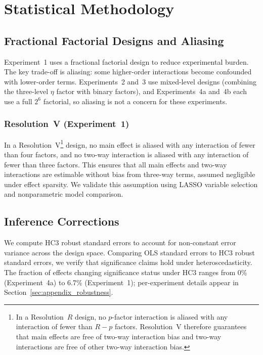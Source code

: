 \section{Statistical Methodology}
\label{sec:appendix_inference}

\subsection{Fractional Factorial Designs and Aliasing}

Experiment~1 uses a fractional factorial design to reduce experimental burden. The key trade-off is aliasing: some higher-order interactions become confounded with lower-order terms. Experiments~2 and~3 use mixed-level designs (combining the three-level $\eta$ factor with binary factors), and Experiments~4a and~4b each use a full $2^6$ factorial, so aliasing is not a concern for these experiments.

\subsubsection{Resolution~V (Experiment~1)}

In a Resolution~V\footnote{In a Resolution~$R$ design, no $p$-factor interaction is aliased with any interaction of fewer than $R - p$ factors. Resolution~V therefore guarantees that main effects are free of two-way interaction bias and two-way interactions are free of other two-way interaction bias.} design, no main effect is aliased with any interaction of fewer than four factors, and no two-way interaction is aliased with any interaction of fewer than three factors. This ensures that all main effects and two-way interactions are estimable without bias from three-way terms, assumed negligible under effect sparsity. We validate this assumption using LASSO variable selection and nonparametric model comparison.

\subsection{Inference Corrections}

We compute HC3 robust standard errors \citep{MacKinnonWhite1985} to account for non-constant error variance across the design space. Comparing OLS standard errors to HC3 robust standard errors, we verify that significance claims hold under heteroscedasticity. The fraction of effects changing significance status under HC3 ranges from 0\% (Experiment~4a) to 6.7\% (Experiment~1); per-experiment details appear in Section~\ref{sec:appendix_robustness}.


